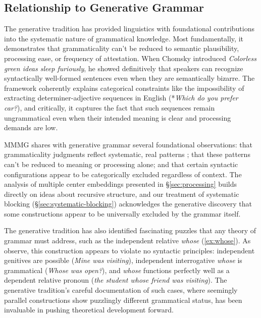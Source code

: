 \documentclass[12pt,letterpaper]{article}
\begin{document}
\subsection{Relationship to Generative Grammar}

The generative tradition has provided linguistics with foundational contributions into the systematic nature of grammatical knowledge. Most fundamentally, it demonstrates that grammaticality can't be reduced to semantic plausibility, processing ease, or frequency of attestation. When Chomsky introduced \textit{Colorless green ideas sleep furiously}, he showed definitively that speakers can recognize syntactically well-formed sentences even when they are semantically bizarre. The framework coherently explains categorical constraints like the impossibility of extracting determiner-adjective sequences in English (*\textit{Which do you prefer car?}), and critically, it captures the fact that such sequences remain ungrammatical even when their intended meaning is clear and processing demands are low. 

MMMG shares with generative grammar several foundational observations: that grammaticality judgments reflect systematic, real patterns \autocite{Dennett1991}; that these patterns can't be reduced to meaning or processing alone; and that certain syntactic configurations appear to be categorically excluded regardless of context. The analysis of multiple center embeddings presented in \S\ref{sec:processing} builds directly on ideas about recursive structure, and our treatment of systematic blocking (\S\ref{sec:systematic-blocking}) acknowledges the generative discovery that some constructions appear to be universally excluded by the grammar itself.

The generative tradition has also identified fascinating puzzles that any theory of grammar must address, such as the independent relative \textit{whose} (\ref{ex:whose}). As \textcite{hankamer1973whose} observe, this construction appears to violate no syntactic principles: independent genitives are possible (\textit{Mine was visiting}), independent interrogative \textit{whose} is grammatical (\textit{Whose was open?}), and \textit{whose} functions perfectly well as a dependent relative pronoun (\textit{the student whose friend was visiting}). The generative tradition's careful documentation of such cases, where seemingly parallel constructions show puzzlingly different grammatical status, has been invaluable in pushing theoretical development forward.
\end{document}

